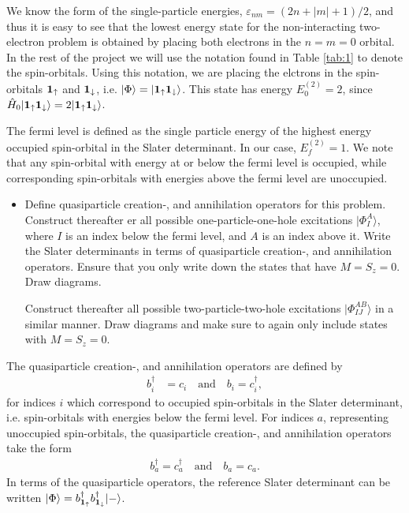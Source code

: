 \documentclass[a4paper]{article}
\newcommand{\tab}[1]{Table \ref{tab:#1}}
\renewcommand{\u}[1]{{\bf #1}_\uparrow}
\renewcommand{\d}[1]{{\bf #1}_\downarrow}
\newcommand{\boud}{b_{\u{1}}^\dagger}
\newcommand{\bodd}{b_{\d{1}}^\dagger}
\begin{document}
We know the form of the single-particle energies, $\varepsilon_{n m}=(2n+|m|+1)/2$, and thus it is easy to see that the lowest energy state for the non-interacting two-electron problem is obtained by placing both electrons in the $n=m=0$ orbital. In the rest of the project we will use the notation found in \tab{1} to denote the spin-orbitals. Using this notation, we are placing the elctrons in the spin-orbitals $\u{1}$ and $\d{1}$, i.e. $|\Phi\rangle = |\u{1}\d{1}\rangle$. This state has energy $E_0^{(2)}=2$, since $\hat{H}_0|\u{1}\d{1}\rangle=2|\u{1}\d{1}\rangle$. 

The fermi level is defined as the single particle energy of the highest energy occupied spin-orbital in the Slater determinant. In our case, $E^{(2)}_f=1$. We note that any spin-orbital with energy at or below the fermi level is occupied, while corresponding spin-orbitals with energies above the fermi level are unoccupied.

\begin{exframe}
\begin{itemize}
  \item[\phantom{2a)}] Define quasiparticle creation-, and annihilation operators for this problem. Construct thereafter er all possible one-particle-one-hole excitations $|\Phi^A_I\rangle$, where $I$ is an index below the fermi level, and $A$ is an index above it. Write the Slater determinants in terms of quasiparticle creation-, and annihilation operators. Ensure that you only write down the states that have $M=S_z=0$. Draw diagrams.

  Construct thereafter all possible two-particle-two-hole excitations $|\Phi_{IJ}^{AB}\rangle$ in a similar manner. Draw diagrams and make sure to again only include states with $M=S_z=0$. 
\end{itemize}
\end{exframe}
The quasiparticle creation-, and annihilation operators are defined by
\begin{align}
b^\dagger_i &= c_i \ \ \ \text{ and } \ \ \ b_i = c_i^\dagger,
\end{align}
for indices $i$ which correspond to occupied spin-orbitals in the Slater determinant, i.e. spin-orbitals with energies below the fermi level. For indices $a$, representing unoccupied spin-orbitals, the quasiparticle creation-, and annihilation operators take the form
\begin{align}
b^\dagger_a = c^\dagger_a \ \ \ \text{ and } \ \ \ b_a = c_a.
\end{align}
In terms of the quasiparticle operators, the reference Slater determinant can be written $|\Phi\rangle = \boud\bodd|-\rangle$.
\end{document}
